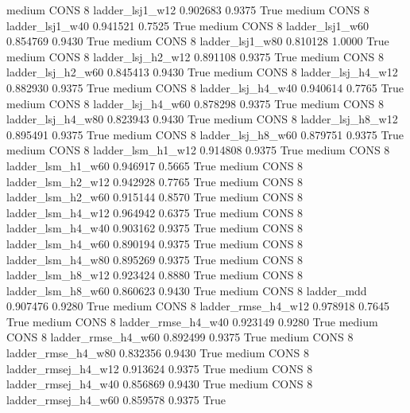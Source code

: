     medium     CONS                 8     ladder_lsj1_w12   0.902683      0.9375    True
    medium     CONS                 8     ladder_lsj1_w40   0.941521      0.7525    True
    medium     CONS                 8     ladder_lsj1_w60   0.854769      0.9430    True
    medium     CONS                 8     ladder_lsj1_w80   0.810128      1.0000    True
    medium     CONS                 8   ladder_lsj_h2_w12   0.891108      0.9375    True
    medium     CONS                 8   ladder_lsj_h2_w60   0.845413      0.9430    True
    medium     CONS                 8   ladder_lsj_h4_w12   0.882930      0.9375    True
    medium     CONS                 8   ladder_lsj_h4_w40   0.940614      0.7765    True
    medium     CONS                 8   ladder_lsj_h4_w60   0.878298      0.9375    True
    medium     CONS                 8   ladder_lsj_h4_w80   0.823943      0.9430    True
    medium     CONS                 8   ladder_lsj_h8_w12   0.895491      0.9375    True
    medium     CONS                 8   ladder_lsj_h8_w60   0.879751      0.9375    True
    medium     CONS                 8   ladder_lsm_h1_w12   0.914808      0.9375    True
    medium     CONS                 8   ladder_lsm_h1_w60   0.946917      0.5665    True
    medium     CONS                 8   ladder_lsm_h2_w12   0.942928      0.7765    True
    medium     CONS                 8   ladder_lsm_h2_w60   0.915144      0.8570    True
    medium     CONS                 8   ladder_lsm_h4_w12   0.964942      0.6375    True
    medium     CONS                 8   ladder_lsm_h4_w40   0.903162      0.9375    True
    medium     CONS                 8   ladder_lsm_h4_w60   0.890194      0.9375    True
    medium     CONS                 8   ladder_lsm_h4_w80   0.895269      0.9375    True
    medium     CONS                 8   ladder_lsm_h8_w12   0.923424      0.8880    True
    medium     CONS                 8   ladder_lsm_h8_w60   0.860623      0.9430    True
    medium     CONS                 8          ladder_mdd   0.907476      0.9280    True
    medium     CONS                 8  ladder_rmse_h4_w12   0.978918      0.7645    True
    medium     CONS                 8  ladder_rmse_h4_w40   0.923149      0.9280    True
    medium     CONS                 8  ladder_rmse_h4_w60   0.892499      0.9375    True
    medium     CONS                 8  ladder_rmse_h4_w80   0.832356      0.9430    True
    medium     CONS                 8 ladder_rmsej_h4_w12   0.913624      0.9375    True
    medium     CONS                 8 ladder_rmsej_h4_w40   0.856869      0.9430    True
    medium     CONS                 8 ladder_rmsej_h4_w60   0.859578      0.9375    True
